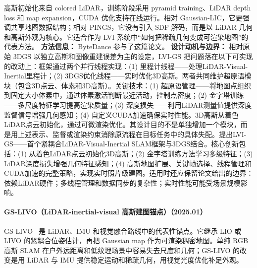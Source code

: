 高斯初始化来自 colored LiDAR，训练阶段采用 pyramid training、LiDAR depth loss 和 map expansion，CUDA 优化支持在线运行。相对 Gaussian-LIC，它更强调共享地图数据结构；相对 PINGS，它没有引入 SDF 解码，而是以 LiDAR 几何和高斯外观为核心。它适合作为 LVI 系统中“如何把稀疏几何变成可渲染地图”的代表方法。
\textbf{方法信息：} ByteDance 参与了这篇论文。
\textbf{设计动机与边界：} 相对原始 3DGS 以独立高斯和图像重建误差为主的设定，LVI-GS 把问题落在以下可实现的改动上：框架通过两个并行线程实现：(1) 里程计线程——处理LiDAR-Visual-Inertial里程计；(2) 3DGS优化线程——实时优化3D高斯。两者共同维护超原语模块（包含3D点云、体素和3D高斯）。关键技术：(1) 超原语管理——将地图点组织到固定大小体素中，通过体素激活判断最近活动，控制点密度；(2) 金字塔训练——多尺度特征学习提高渲染质量；(3) 深度损失——利用LiDAR测量值提供深度监督信号增强几何感知；(4) 自定义CUDA加速确保实时性能。3D高斯从着色LiDAR点云初始化，通过可微渲染优化。其设计目的不是单独增加一个模块，而是用上述表示、监督或渲染约束消除原流程在目标任务中的具体失配。提出LVI-GS——首个紧耦合LiDAR-Visual-Inertial SLAM框架与3DGS结合。核心创新包括：(1) 从着色LiDAR点云初始化3D高斯；(2) 金字塔训练方法学习多级特征；(3) LiDAR深度损失增强几何特征感知；(4) 高斯地图扩展、关键帧选择、线程管理和CUDA加速的完整策略，实现实时照片级建图。适用时还应保留论文给出的边界：依赖LiDAR硬件；多线程管理和数据同步的复杂性；实时性能可能受场景规模影响。
\paragraph{GS-LIVO（LiDAR-inertial-visual 高斯建图锚点）（2025.01）}
GS-LIVO~\cite{2501_08672} 是 LiDAR、IMU 和视觉融合路线中的代表性锚点。它继承 LIO 或 LIVO 的紧耦合位姿估计，再把 Gaussian map 作为可渲染稠密地图。单纯 RGB 高斯 SLAM 在户外远距离和低纹理场景中容易失去尺度和几何；GS-LIVO 的改变是用 LiDAR 与 IMU 提供稳定运动和稀疏几何，用视觉光度优化补足外观。

